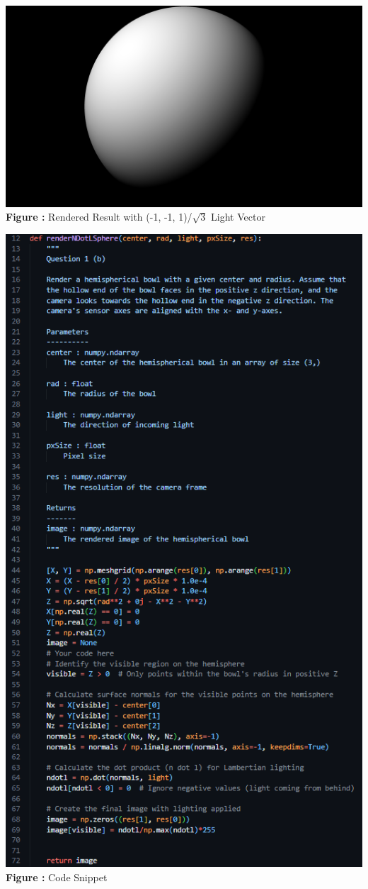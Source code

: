 \documentclass{article}
\begin{document}
	\begin{minipage}{0.31\linewidth}
	\centering
	\includegraphics[width=\linewidth]{./src/1b-c.png}
	\textbf{Figure \thefigure:} Rendered Result with (-1, -1, 1)/$\sqrt{3}$ Light Vector  %
	\label{fig:Q1_b_c}         %
	\end{minipage}	
	\newline
	\newline

	\begin{minipage}{1\linewidth}
	\centering
	\includegraphics[width=0.7\linewidth, height=0.95\columnwidth]{./Q1_b_cns.png}
	  \\%
	\textbf{Figure \thefigure:} Code Snippet  %
	\label{fig:Q1_b_cns}         %
	\end{minipage}	
	
\end{document}
